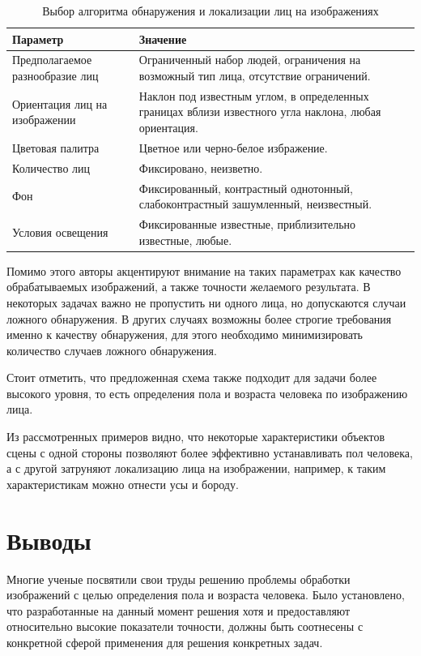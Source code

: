 \begin{table}[ht]
  \caption{Выбор алгоритма обнаружения и локализации лиц на изображениях}
  \begin{tabular}{|p{}|p{}|}
  \hline
  Параметр & Значение \\ 
  \hline
  Предполагаемое разнообразие лиц & Ограниченный набор людей, ограничения на
возможный тип лица, отсутствие ограничений. \\ 
  \hline
  Ориентация лиц на изображении & Наклон под известным
углом, в определенных границах вблизи известного угла наклона, любая
ориентация. \\
  \hline
  Цветовая палитра & Цветное или черно-белое избражение. \\
  \hline
  Количество лиц & Фиксировано, неизветно. \\
  \hline
  Фон & Фиксированный, контрастный однотонный, слабоконтрастный зашумленный,
неизвестный. \\
  \hline
  Условия освещения & Фиксированные известные, приблизительно известные, любые.
  \\
  \hline
  \end{tabular}
  \label{tab:chose_algo}
\end{table}

Помимо этого авторы акцентируют внимание на таких параметрах как качество
обрабатываемых изображений, а также точности желаемого результата. В некоторых
задачах важно не пропустить ни одного лица, но допускаются случаи ложного
обнаружения. В других случаях возможны более строгие требования именно к
качеству обнаружения, для этого необходимо минимизировать количество случаев
ложного обнаружения.

Стоит отметить, что предложенная схема также подходит для задачи более высокого
уровня, то есть определения пола и возраста человека по изображению лица.

Из рассмотренных примеров видно, что некоторые характеристики объектов сцены
с одной стороны позволяют более эффективно устанавливать пол человека, а с
другой затруняют локализацию лица на изображении, например, к таким
характеристикам можно отнести усы и бороду.




\section{Выводы}
Многие ученые посвятили свои труды решению проблемы обработки изображений с
целью определения пола и возраста человека. Было установлено, что разработанные
на данный момент решения хотя и предоставляют относительно высокие показатели
точности, должны быть соотнесены с конкретной сферой применения для решения
конкретных задач.


